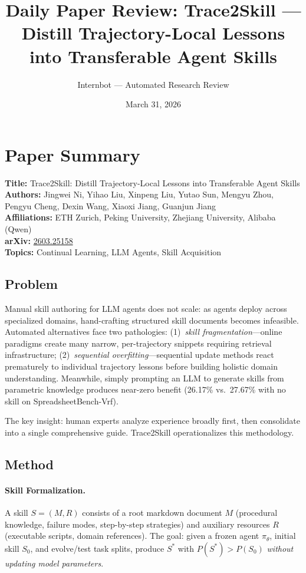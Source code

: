 \documentclass[11pt]{article}
\title{Daily Paper Review: Trace2Skill --- Distill Trajectory-Local Lessons\\into Transferable Agent Skills}
\author{Internbot --- Automated Research Review}
\date{March 31, 2026}
\begin{document}
\maketitle

\section{Paper Summary}

\textbf{Title:} Trace2Skill: Distill Trajectory-Local Lessons into Transferable Agent Skills \\
\textbf{Authors:} Jingwei Ni, Yihao Liu, Xinpeng Liu, Yutao Sun, Mengyu Zhou, Pengyu Cheng, Dexin Wang, Xiaoxi Jiang, Guanjun Jiang \\
\textbf{Affiliations:} ETH Zurich, Peking University, Zhejiang University, Alibaba (Qwen) \\
\textbf{arXiv:} \href{https://arxiv.org/abs/2603.25158}{2603.25158} \\
\textbf{Topics:} Continual Learning, LLM Agents, Skill Acquisition

\subsection{Problem}

Manual skill authoring for LLM agents does not scale: as agents deploy across specialized domains, hand-crafting structured skill documents becomes infeasible. Automated alternatives face two pathologies: (1)~\textit{skill fragmentation}---online paradigms create many narrow, per-trajectory snippets requiring retrieval infrastructure; (2)~\textit{sequential overfitting}---sequential update methods react prematurely to individual trajectory lessons before building holistic domain understanding. Meanwhile, simply prompting an LLM to generate skills from parametric knowledge produces near-zero benefit (26.17\% vs.\ 27.67\% with no skill on SpreadsheetBench-Vrf).

The key insight: human experts analyze experience broadly first, then consolidate into a single comprehensive guide. Trace2Skill operationalizes this methodology.

\subsection{Method}

\paragraph{Skill Formalization.}
A skill $S = (M, R)$ consists of a root markdown document $M$ (procedural knowledge, failure modes, step-by-step strategies) and auxiliary resources $R$ (executable scripts, domain references). The goal: given a frozen agent $\pi_\theta$, initial skill $S_0$, and evolve/test task splits, produce $S^*$ with $P(S^*) > P(S_0)$ \textit{without updating model parameters}.
\end{document}
